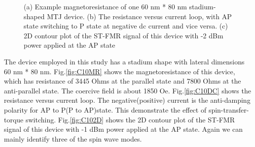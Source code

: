 \begin{figure}[!ht]
\centering
{}
\caption{(a) Example magnetoresistance of one 60 nm * 80 nm stadium-shaped MTJ device. (b) The resistance versus current loop, with AP state switching to P state at negative dc current and vice versa. (c) 2D contour plot of the ST-FMR signal of this device with -2 dBm power applied at the AP state }
\end{figure}

The device employed in this study has a stadium shape with lateral dimensions 60 nm * 80 nm. Fig.\ref{fig:C10MR} shows the magnetoresistance of this device, which has resistance of 3445 Ohms at the parallel state and 7800 Ohms at the anti-parallel state. The coercive field is about 1850 Oe. Fig.\ref{fig:C10DC} shows the resistance versus current loop. The negative(positive) current is the anti-damping polarity for AP to P(P to AP)state. This demonstrate the effect of spin-transfer-torque switching. Fig.\ref{fig:C102D} shows the 2D contour plot of the ST-FMR signal of this device with -1 dBm power applied at the AP state. Again we can mainly identify three of the spin wave modes. 

